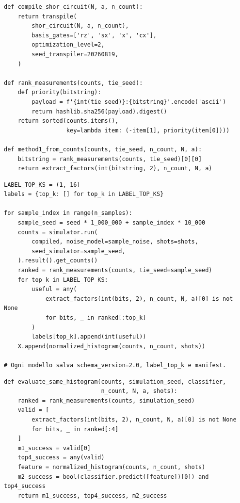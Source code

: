 \begin{lstlisting}[caption={Compilazione deterministica, tie-break SHA-256 e baseline TOP-1}, label={lst:pipeline_del_metodo_1}]
def compile_shor_circuit(N, a, n_count):
    return transpile(
        shor_circuit(N, a, n_count),
        basis_gates=['rz', 'sx', 'x', 'cx'],
        optimization_level=2,
        seed_transpiler=20260819,
    )

def rank_measurements(counts, tie_seed):
    def priority(bitstring):
        payload = f'{int(tie_seed)}:{bitstring}'.encode('ascii')
        return hashlib.sha256(payload).digest()
    return sorted(counts.items(),
                  key=lambda item: (-item[1], priority(item[0])))

def method1_from_counts(counts, tie_seed, n_count, N, a):
    bitstring = rank_measurements(counts, tie_seed)[0][0]
    return extract_factors(int(bitstring, 2), n_count, N, a)
\end{lstlisting}

\begin{lstlisting}[caption={Dataset condiviso per l'audit delle etichette TOP-1 e TOP-16}, label={lst:generazione_del_dataset_con}]
LABEL_TOP_KS = (1, 16)
labels = {top_k: [] for top_k in LABEL_TOP_KS}

for sample_index in range(n_samples):
    sample_seed = seed * 1_000_000 + sample_index * 10_000
    counts = simulator.run(
        compiled, noise_model=sample_noise, shots=shots,
        seed_simulator=sample_seed,
    ).result().get_counts()
    ranked = rank_measurements(counts, tie_seed=sample_seed)
    for top_k in LABEL_TOP_KS:
        useful = any(
            extract_factors(int(bits, 2), n_count, N, a)[0] is not None
            for bits, _ in ranked[:top_k]
        )
        labels[top_k].append(int(useful))
    X.append(normalized_histogram(counts, n_count, shots))

# Ogni modello salva schema_version=2.0, label_top_k e manifest.
\end{lstlisting}

\begin{lstlisting}[caption={Decisione M2 sullo stesso istogramma usato da M1 e TOP-4}, label={lst:loop_di_inferenza_del}]
def evaluate_same_histogram(counts, simulation_seed, classifier,
                            n_count, N, a, shots):
    ranked = rank_measurements(counts, simulation_seed)
    valid = [
        extract_factors(int(bits, 2), n_count, N, a)[0] is not None
        for bits, _ in ranked[:4]
    ]
    m1_success = valid[0]
    top4_success = any(valid)
    feature = normalized_histogram(counts, n_count, shots)
    m2_success = bool(classifier.predict([feature])[0]) and top4_success
    return m1_success, top4_success, m2_success
\end{lstlisting}

